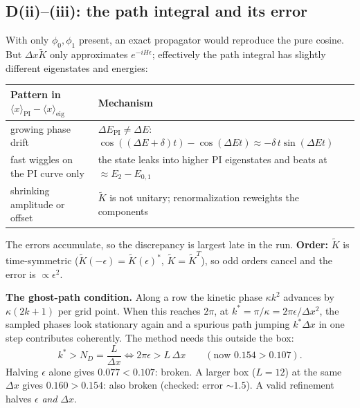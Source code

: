 \documentclass[10pt]{article}
\begin{document}
\subsection{D(ii)--(iii): the path integral and its error}
With only $\phi_0,\phi_1$ present, an exact propagator would reproduce the pure cosine. But $\Delta x\tilde K$ only approximates $e^{-iH\epsilon}$; effectively the path integral has slightly different eigenstates and energies:
\begin{center}\small
\begin{tabular}{@{}ll@{}}
\toprule
\textbf{Pattern in $\langle x\rangle_\text{PI}-\langle x\rangle_\text{eig}$} & \textbf{Mechanism}\\
\midrule
growing phase drift & $\Delta E_\text{PI}\ne\Delta E$: $\cos((\Delta E+\delta)t)-\cos(\Delta Et)\approx-\delta\,t\sin(\Delta Et)$\\
fast wiggles on the PI curve only & the state leaks into higher PI eigenstates and beats at $\approx E_2-E_{0,1}$\\
shrinking amplitude or offset & $\tilde K$ is not unitary; renormalization reweights the components\\
\bottomrule
\end{tabular}
\end{center}
The errors accumulate, so the discrepancy is largest late in the run. \textbf{Order:} $\tilde K$ is time-symmetric ($\tilde K(-\epsilon)=\tilde K(\epsilon)^*$, $\tilde K=\tilde K^T$), so odd orders cancel and the error is $\propto\epsilon^2$.

\textbf{The ghost-path condition.} Along a row the kinetic phase $\kappa k^2$ advances by $\kappa(2k+1)$ per grid point. When this reaches $2\pi$, at $k^*=\pi/\kappa=2\pi\epsilon/\Delta x^2$, the sampled phases look stationary again and a spurious path jumping $k^*\Delta x$ in one step contributes coherently. The method needs this outside the box:
\[
k^*>N_D=\frac L{\Delta x}\iff\boxed{2\pi\epsilon>L\,\Delta x}\qquad(\text{now }0.154>0.107).
\]
Halving $\epsilon$ alone gives $0.077<0.107$: broken. A larger box ($L=12$) at the same $\Delta x$ gives $0.160>0.154$: also broken (checked: error $\sim1.5$). A valid refinement halves $\epsilon$ \emph{and} $\Delta x$.
\end{document}
